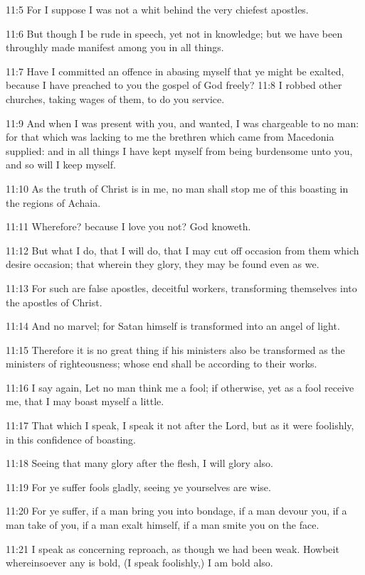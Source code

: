 11:5 For I suppose I was not a whit behind the very chiefest apostles.

11:6 But though I be rude in speech, yet not in knowledge; but we have been throughly made manifest among you in all things.

11:7 Have I committed an offence in abasing myself that ye might be exalted, because I have preached to you the gospel of God freely?  11:8 I robbed other churches, taking wages of them, to do you service.

11:9 And when I was present with you, and wanted, I was chargeable to no man: for that which was lacking to me the brethren which came from Macedonia supplied: and in all things I have kept myself from being burdensome unto you, and so will I keep myself.

11:10 As the truth of Christ is in me, no man shall stop me of this boasting in the regions of Achaia.

11:11 Wherefore? because I love you not? God knoweth.

11:12 But what I do, that I will do, that I may cut off occasion from them which desire occasion; that wherein they glory, they may be found even as we.

11:13 For such are false apostles, deceitful workers, transforming themselves into the apostles of Christ.

11:14 And no marvel; for Satan himself is transformed into an angel of light.

11:15 Therefore it is no great thing if his ministers also be transformed as the ministers of righteousness; whose end shall be according to their works.

11:16 I say again, Let no man think me a fool; if otherwise, yet as a fool receive me, that I may boast myself a little.

11:17 That which I speak, I speak it not after the Lord, but as it were foolishly, in this confidence of boasting.

11:18 Seeing that many glory after the flesh, I will glory also.

11:19 For ye suffer fools gladly, seeing ye yourselves are wise.

11:20 For ye suffer, if a man bring you into bondage, if a man devour you, if a man take of you, if a man exalt himself, if a man smite you on the face.

11:21 I speak as concerning reproach, as though we had been weak.  Howbeit whereinsoever any is bold, (I speak foolishly,) I am bold also.

